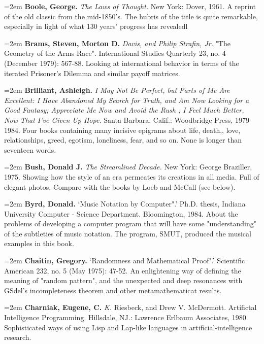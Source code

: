 \par\noindent\hangindent=2em {\bf Boole, George.} {\it The Laws of Thought.} New York: Dover, 1961. A reprint of the old classic from the mid-1850's. The hubris of the title is quite remarkable, especially in light of what 130 years' progress has revealedl

\par\noindent\hangindent=2em {\bf Brams, Steven, Morton D.} {\it Davis, and Philip Strafin, Jr.} "The Geometry of the Arms Race". International Studies Quarterly 23, no. 4 (December 1979): 567-88. Looking at international behavior in terms of the iterated Prisoner's Dilemma and similar payoff matrices.

\par\noindent\hangindent=2em {\bf Brilliant, Ashleigh.} {\it I May Not Be Perfect, but Parts of Me Are Excellent: I Have Abandoned My Search for Truth, and Am Now Looking for a Good Fantasy; Appreciate Me Now and Avoid the Rush ; I Feel Much Better, Now That I've Given Up Hope.} Santa Barbara, Calif.: Woodbridge Press, 1979-1984. Four books containing many incisive epigrams about life, death,, love, relationships, greed, egotism, loneliness, fear, and so on. None is longer than seventeen words.

\par\noindent\hangindent=2em {\bf Bush, Donald J.} {\it The Streamlined Decade.} New York: George Braziller, 1975. Showing how the style of an era permeates its creations in all media. Full of elegant photos. Compare with the books by Loeb and McCall (see below).

\par\noindent\hangindent=2em {\bf Byrd, Donald.} `Music Notation by Computer".' Ph.D. thesis, Indiana University Computer - Science Department. Bloomington, 1984. About the problems of developing a computer program that will have some "understanding" of the subtleties of music notation. The program, SMUT, produced the musical examples in this book.

\par\noindent\hangindent=2em {\bf Chaitin, Gregory.} `Randomness and Mathematical Proof".' Scientific American 232, no. 5 (May 1975): 47-52. An enlightening way of defining the meaning of "random pattern", and the unexpected and deep resonances with GSdel's incompleteness theorem and other metamathematicat results.

\par\noindent\hangindent=2em {\bf Charniak, Eugene, C.} {\it K.} Riesbeck, and Drew V. McDermott. Artifictal Intelligence Programming. Hillsdale, NJ.: Lawrence Erlbaum Associates, 1980. Sophisticated ways of using Lisp and Lap-like languages in artificial-intelligence research.

